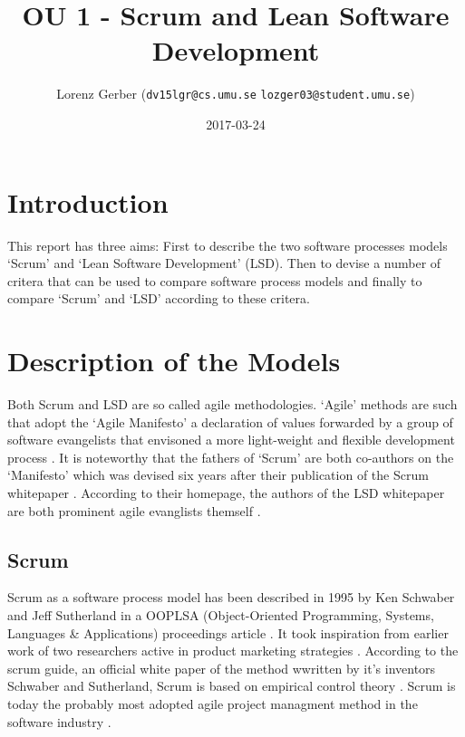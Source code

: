\documentclass[a4paper,11pt,twoside]{article}
\title{OU 1 - Scrum and Lean Software Development}
\author{Lorenz Gerber ({\tt{dv15lgr@cs.umu.se}} {\tt{lozger03@student.umu.se}})}
\date{2017-03-24}
\begin{document}
\lstset{language=C}
\maketitle
\thispagestyle{empty}
\newpage

\clearpage
{}

\section{Introduction}
This report has three aims: First to describe the two software processes models `Scrum' and `Lean Software Development' (LSD). Then to devise a number of critera that can be used to compare software process models and finally to compare `Scrum' and `LSD' according to these critera.

\section{Description of the Models}
Both Scrum and LSD are so called agile methodologies. `Agile' methods are such that adopt the `Agile Manifesto' a declaration of values forwarded by a group of software evangelists that envisoned a more light-weight and flexible development process \cite{manifesto}. It is noteworthy that the fathers of `Scrum' are both co-authors on the `Manifesto' which was devised six years after their publication of the Scrum whitepaper \cite{oopsla}. According to their homepage, the authors of the LSD whitepaper are both prominent agile evanglists themself \cite{poppendieckweb}. 

\subsection{Scrum}
Scrum as a software process model has been described in 1995 by Ken Schwaber and Jeff Sutherland in a OOPLSA (Object-Oriented Programming, Systems, Languages \& Applications) proceedings article \cite{oopsla1995}. It took inspiration from earlier work of two researchers active in product marketing strategies \cite{takeuchi1986}. According to the scrum guide, an official white paper of the method wwritten by it's inventors Schwaber and Sutherland, Scrum is based on empirical control theory \cite{scrumguide}. Scrum is today the probably most adopted agile project managment method in the software industry \cite[p. 86]{sommerville2016}.
\end{document}
